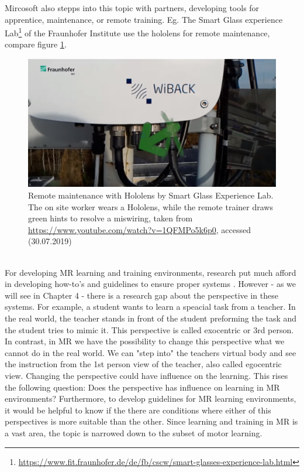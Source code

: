 Mircosoft also stepps into this topic with partners, developing tools for apprentice, maintenance, or remote training. Eg. The Smart Glass experience Lab\footnote{\hyperlink{https://www.fit.fraunhofer.de/de/fb/cscw/smart-glasses-experience-lab.html}{https://www.fit.fraunhofer.de/de/fb/cscw/smart-glasses-experience-lab.html}} of the Fraunhofer Institute use the hololens for remote maintenance, compare figure \ref{fig:fraunhofer}.
\begin{figure}
	\centering
	\includegraphics[width=1.0\textwidth]{img/fraunhofer.PNG}
	\caption{Remote maintenance with Hololens by Smart Glass Experience Lab. The on site worker wears a Hololens, while the remote trainer draws green hints to resolve a miswiring, taken from \hyperlink{https://www.youtube.com/watch?v=1QFMPo5k6p0}{https://www.youtube.com/watch?v=1QFMPo5k6p0}, accessed (30.07.2019)}
	\label{fig:fraunhofer}
\end{figure}\\
For developing MR learning and training environments, research put much afford in developing how-to's and guidelines to ensure proper systems \cite{LaViola2017}. However - as we will see in Chapter 4 - there is a research gap about the perspective in these systems. For example, a student wants to learn a speacial task from a teacher. In the real world, the teacher stands in front of the student preforming the task and the student tries to mimic it. This perspective is called exocentric or 3rd person. In contrast, in MR we have the possibility to change this perspective what we cannot do in the real world. We can "step into" the teachers virtual body and see the instruction from the 1st person view of the teacher, also called egocentric view. Changing the perspective could have influence on the learning. This rises the following question: Does the perspective has influence on learning in MR environments? Furthermore, to develop guidelines for MR learning environments, it would be helpful to know if the there are conditions where either of this perspectives is more suitable than the other. Since learning and training in MR is a vast area, the topic is narrowed down to the subset of motor learning. 
